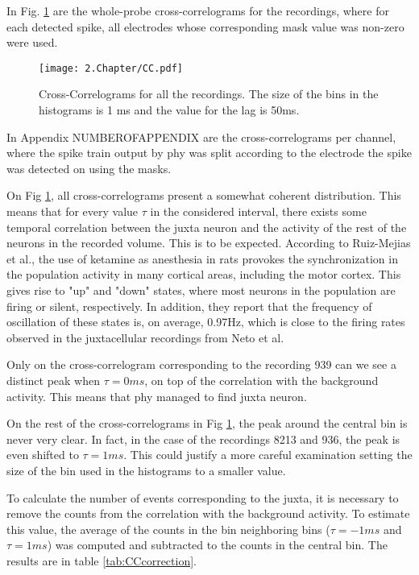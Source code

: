 In Fig. \ref{fig:CC} are the whole-probe cross-correlograms for the recordings, where for each detected spike, all electrodes whose corresponding mask value was non-zero were used.

\begin{figure}[!h]
	\centering
	\texttt{[image: 2.Chapter/CC.pdf]}
	\caption{Cross-Correlograms for all the recordings. The size of the bins in the histograms is 1 ms and the value for the lag is 50ms.
}
\label{fig:CC}
\end{figure}

In Appendix NUMBEROFAPPENDIX are the cross-correlograms per channel, where the spike train output by phy was split according to the electrode the spike was detected on using the masks.

On Fig \ref{fig:CC}, all cross-correlograms present a somewhat coherent distribution. This means that for every value $\tau$ in the considered interval, there exists some temporal correlation between the juxta neuron and the activity of the rest of the neurons in the recorded volume. This is to be expected. According to Ruiz-Mejias et al., the use of ketamine as anesthesia in rats provokes the synchronization in the population activity in many cortical areas, including the motor cortex. This gives rise to "up" and "down" states, where most neurons in the population are firing or silent, respectively. In addition, they report that the frequency of oscillation of these states is, on average, 0.97Hz, which is close to the firing rates observed in the juxtacellular recordings from Neto et al. 

Only on the cross-correlogram corresponding to the recording 939 can we see a distinct peak when $\tau=0 ms$, on top of the correlation with the background activity. This means that phy managed to find juxta neuron.

On the rest of the cross-correlograms in Fig \ref{fig:CC}, the peak around the central bin is never very clear. In fact, in the case of the recordings 8213 and 936, the peak is even shifted to $\tau=1 ms$. This could justify a more careful examination setting the size of the bin used in the histograms to a smaller value.

To calculate the number of events corresponding to the juxta, it is necessary to remove the counts from the correlation with the background activity. To estimate this value, the average of the counts in the bin neighboring bins ($\tau = -1ms$ and $\tau = 1 ms$) was computed and subtracted to the counts in the central bin. The results are in table \ref{tab:CCcorrection}.

